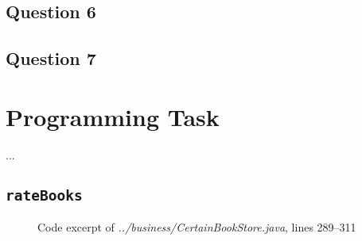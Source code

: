 \documentclass[10pt,a4paper]{article}
\newcommand{\srcroot}{../src/com/acertainbookstore/}
\newcommand{\codeexcerpt}[3]
{
\begin{figure}[H]

\caption{Code excerpt of {\it ../#1}, lines #2--#3}
\end{figure}
}
\begin{document}
\subsection{Question 6}

\subsection{Question 7}


\section{Programming Task}
...

\subsection{\tt rateBooks}
\codeexcerpt{business/CertainBookStore.java}{289}{311}
\end{document}

